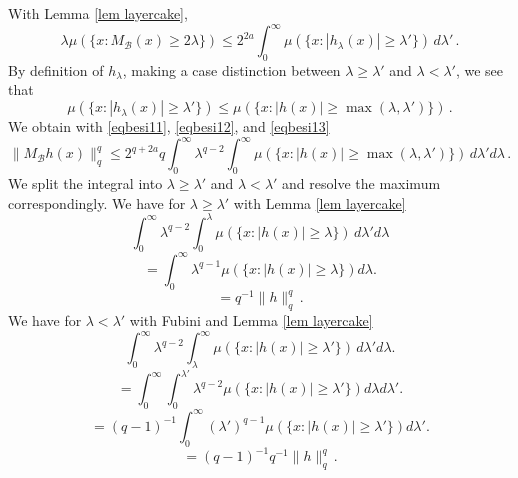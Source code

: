 With Lemma \ref{lem layercake},
\begin{equation}\label{eqbesi12}
    \lambda \mu(\{x: M_{\mathcal{B}}(x)\ge 2\lambda\})\le
    2^{2a}
    \int_0^\infty  \mu (\{x: |h_\lambda (x)|\ge \lambda'\})\, d\lambda'\, .
\end{equation}
By definition of $h_\lambda$, making a case distinction between $\lambda\ge \lambda'$ and $\lambda <\lambda'$, we see that
\begin{equation}\label{eqbesi13}
    \mu (\{x: |h_\lambda (x)|\ge \lambda'\})
    \le
    \mu (\{x: |h (x)|\ge \max(\lambda,\lambda')\})\, .
\end{equation}
We obtain with \eqref{eqbesi11},
\eqref{eqbesi12}, and \eqref{eqbesi13}
\begin{equation}
    \|M_{\mathcal{B}}h(x)\|_q^q
    \le 2^{q+2a} q
    \int_0^\infty \lambda^{q-2}
    \int_0^\infty
    \mu (\{x: |h (x)|\ge \max(\lambda,\lambda')\})
    \, d\lambda'd\lambda\, .
\end{equation}
We split the integral  into $\lambda\ge \lambda'$ and $\lambda<\lambda'$ and resolve the
maximum correspondingly.
We have for $\lambda\ge \lambda'$
with Lemma \ref{lem layercake}
\begin{equation}
    \int_0^\infty \lambda^{q-2}
    \int_0^\lambda
    \mu (\{x: |h (x)|\ge \lambda\})
    \, d\lambda'd\lambda
\end{equation}
\begin{equation}
    =\int_0^\infty \lambda^{q-1}
        \mu (\{x: |h (x)|\ge \lambda\})
d\lambda.
\end{equation}
\begin{equation}\label{eqbesi14}
    =q^{-1} \|h\|_q^q\, .
\end{equation}
We have for $\lambda< \lambda'$
with Fubini and Lemma \ref{lem layercake}
\begin{equation}
    \int_0^\infty \lambda^{q-2}
    \int_\lambda^\infty
    \mu (\{x: |h (x)|\ge \lambda'\})
    \, d\lambda'd\lambda.
\end{equation}
\begin{equation}
    =\int_0^\infty \int_0^{\lambda'}\lambda^{q-2}
        \mu (\{x: |h (x)|\ge \lambda'\})
d\lambda d\lambda'.
\end{equation}
\begin{equation}
    =(q-1)^{-1}\int_0^\infty (\lambda')^{q-1}
        \mu (\{x: |h (x)|\ge \lambda'\})
d\lambda'.
\end{equation}
\begin{equation}\label{eqbesi15}
    =(q-1)^{-1} q^{-1}\|h\|_q^q\, .
\end{equation}

